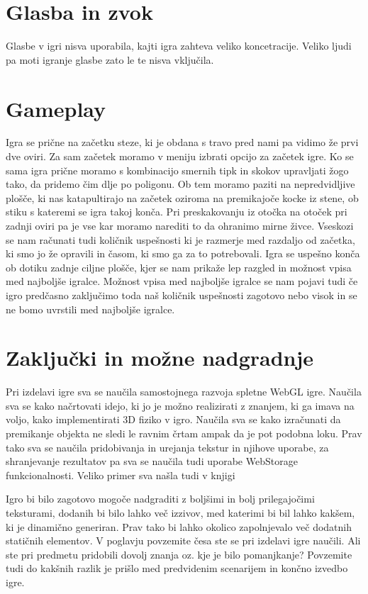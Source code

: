 \documentclass[a4paper]{article}
\begin{document}
\section{Glasba in zvok}
Glasbe v igri nisva uporabila, kajti igra zahteva veliko koncetracije. Veliko ljudi pa moti igranje glasbe zato le te nisva vključila.

\section{Gameplay}
Igra se prične na začetku steze, ki je obdana s travo pred nami pa vidimo že prvi dve oviri. Za sam začetek moramo v meniju izbrati opcijo za začetek igre. Ko se sama igra prične moramo s kombinacijo smernih tipk in skokov upravljati žogo tako, da pridemo čim dlje po poligonu. Ob tem moramo paziti na nepredvidljive plošče, ki nas katapultirajo na začetek oziroma na premikajoče kocke iz stene, ob stiku s kateremi se igra takoj konča. Pri preskakovanju iz otočka na otoček pri zadnji oviri pa je vse kar moramo narediti to da ohranimo mirne živce. Vseskozi se nam računati tudi količnik uspešnosti ki je razmerje med razdaljo od začetka, ki smo jo že opravili in časom, ki smo ga za to potrebovali. Igra se uspešno konča ob dotiku zadnje ciljne plošče, kjer se nam prikaže lep razgled in možnost vpisa med najboljše igralce. Možnost vpisa med najboljše igralce se nam pojavi tudi če igro predčasno zaključimo toda naš količnik uspešnosti zagotovo nebo visok in se ne bomo uvrstili med najboljše igralce.


\section{Zaključki in možne nadgradnje}
Pri izdelavi igre sva se naučila samostojnega razvoja spletne WebGL igre. Naučila sva se kako načrtovati idejo, ki jo je možno realizirati z znanjem, ki ga imava na voljo, kako implementirati 3D fiziko v igro. Naučila sva se kako izračunati da premikanje objekta ne sledi le ravnim črtam ampak da je pot podobna loku. Prav tako sva se naučila pridobivanja in urejanja tekstur in njihove uporabe, za shranjevanje rezultatov pa sva se naučila tudi uporabe WebStorage funkcionalnosti. Veliko primer sva našla tudi v knjigi \cite{dirksen2013learning}

Igro bi bilo zagotovo mogoče nadgraditi z boljšimi in bolj prilegajočimi teksturami, dodanih bi bilo lahko več izzivov, med katerimi bi bil lahko kakšem, ki je dinamično generiran. Prav tako bi lahko okolico zapolnjevalo več dodatnih statičnih elementov.
V poglavju povzemite česa ste se pri izdelavi igre naučili. Ali ste pri predmetu pridobili dovolj znanja oz. kje je bilo pomanjkanje? Povzemite tudi do kakšnih razlik je prišlo med predvidenim scenarijem in končno izvedbo igre. 


\small


\end{document}
